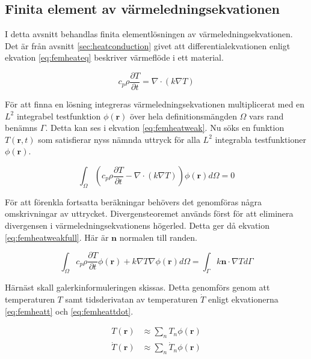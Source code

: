 \subsection{Finita element av värmeledningsekvationen}
\label{sec:femheat}
I detta avsnitt behandlas finita elementlösningen av värmeledningsekvationen.
Det är från avsnitt \ref{sec:heatconduction} givet att differentialekvationen
enligt ekvation \eqref{eq:femheateq} beskriver värmeflöde i ett material.

\begin{equation}
\label{eq:femheateq}
c_p\rho\frac{\partial T}{\partial t} = \nabla\cdot(k\nabla T)
\end{equation}

\noindent
För att finna en lösning integreras värmeledningsekvationen
multiplicerat med en $L^2$ integrabel testfunktion $\phi(\mathbf{r})$ över hela
definitionsmängden $\Omega$ vars rand benämns $\Gamma$.
Detta kan ses i ekvation \eqref{eq:femheatweak}.
Nu söks en funktion $T(\mathbf{r},t)$ som satisfierar nyss nämnda uttryck för
alla $L^2$ integrabla testfunktioner $\phi(\mathbf{r})$.

\begin{equation}
\label{eq:femheatweak}
\int_\Omega \left(c_p\rho\frac{\partial T}{\partial t} -
\nabla\cdot(k\nabla T)\right)\phi(\mathbf{r})d\Omega = 0
\end{equation}

\noindent
För att förenkla fortsatta beräkningar behövers det genomföras några
omskrivningar av uttrycket. Divergensteoremet används först för att 
eliminera divergensen i värmeledningsekvationens högerled. Detta ger då
ekvation \eqref{eq:femheatweakfull}. Här är $\mathbf{n}$ normalen till randen.

\begin{equation}
\label{eq:femheatweakfull}
\int_\Omega c_p\rho\frac{\partial T}{\partial t}\phi(\mathbf{r}) +
k\nabla T\nabla\phi(\mathbf{r}) d\Omega =
\int_\Gamma k\mathbf{n}\cdot\nabla Td\Gamma
\end{equation}

\noindent
Härnäst skall galerkinformuleringen skissas. Detta genomförs
genom att temperaturen $T$ samt tidsderivatan av temperaturen $\dot{T}$
enligt ekvationerna \eqref{eq:femheatt} och \eqref{eq:femheattdot}.

\begin{align}
\label{eq:femheatt}
T(\mathbf{r}) & \approx \sum_n T_n\phi(\mathbf{r}) \\
\label{eq:femheattdot}
\dot{T}(\mathbf{r}) & \approx \sum_n \dot{T}_n\phi(\mathbf{r})
\end{align}

